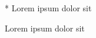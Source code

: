 \documentclass{article}
\begin{document}
\begin{clozebox}*
Lorem ipsum dolor sit
\end{clozebox}

\begin{clozebox}
Lorem ipsum dolor sit
\end{clozebox}
\end{document}
